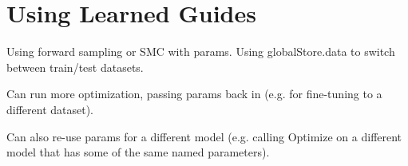 \section{Using Learned Guides}
\label{sec:usingLearnedGuides}

Using forward sampling or SMC with params.
Using globalStore.data to switch between train/test datasets.

Can run more optimization, passing params back in (e.g. for fine-tuning to a different dataset).

Can also re-use params for a different model (e.g. calling Optimize on a different model that has some of the same named parameters). 
